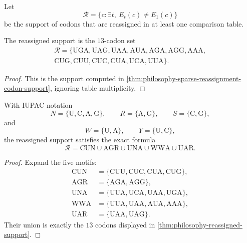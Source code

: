 \begin{definition}
\label{def:philosophy-reassigned-support}
Let
$$
  \mathcal{R}=\{c:\exists t,\ E_{t}(c)\neq E_{1}(c)\}
$$
be the support of codons that are reassigned in at least one comparison
table.
\end{definition}

\begin{theorem}
\label{thm:philosophy-reassigned-support}
The reassigned support is the $13$-codon set
$$
\begin{gathered}
  \mathcal{R}=
  \{\mathrm{UGA},\mathrm{UAG},\mathrm{UAA},\mathrm{AUA},
    \mathrm{AGA},\mathrm{AGG},\mathrm{AAA},\\
    \mathrm{CUG},\mathrm{CUU},\mathrm{CUC},\mathrm{CUA},
    \mathrm{UCA},\mathrm{UUA}\}.
\end{gathered}
$$
\end{theorem}
\begin{proof}
This is the support computed in
\autoref{thm:philosophy-sparse-reassignment-codon-support}, ignoring
table multiplicity.
\end{proof}

\begin{theorem}
\label{thm:philosophy-five-motif-support-formula}
With IUPAC notation
$$
  N=\{\mathrm{U},\mathrm{C},\mathrm{A},\mathrm{G}\},
  \qquad
  R=\{\mathrm{A},\mathrm{G}\},
  \qquad
  S=\{\mathrm{C},\mathrm{G}\},
$$
and
$$
  W=\{\mathrm{U},\mathrm{A}\},
  \qquad
  Y=\{\mathrm{U},\mathrm{C}\},
$$
the reassigned support satisfies the exact formula
$$
  \mathcal{R}
  =
  \mathrm{CUN}\cup\mathrm{AGR}\cup\mathrm{UNA}
  \cup\mathrm{WWA}\cup\mathrm{UAR}.
$$
\end{theorem}
\begin{proof}
Expand the five motifs:
$$
\begin{aligned}
  \mathrm{CUN}&=\{\mathrm{CUU},\mathrm{CUC},\mathrm{CUA},\mathrm{CUG}\},\\
  \mathrm{AGR}&=\{\mathrm{AGA},\mathrm{AGG}\},\\
  \mathrm{UNA}&=\{\mathrm{UUA},\mathrm{UCA},\mathrm{UAA},\mathrm{UGA}\},\\
  \mathrm{WWA}&=\{\mathrm{UUA},\mathrm{UAA},\mathrm{AUA},\mathrm{AAA}\},\\
  \mathrm{UAR}&=\{\mathrm{UAA},\mathrm{UAG}\}.
\end{aligned}
$$
Their union is exactly the $13$ codons displayed in
\autoref{thm:philosophy-reassigned-support}.
\end{proof}

